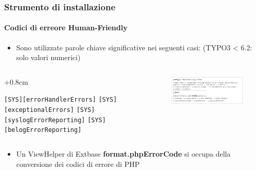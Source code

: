 
\begin{frame}[fragile]
	\frametitle{Strumento di installazione}
	\framesubtitle{Codici di erreore Human-Friendly}

	\begin{itemize}
		\item Sono utilizzate parole chiave significative nei seguenti casi:\newline
			(TYPO3 < 6.2: solo valori numerici)
	\end{itemize}

	\begin{columns}[T]
		\begin{column}{.5\textwidth}
			\advance\leftskip+0.8cm

			\smaller
				\texttt{[SYS][errorHandlerErrors]}\newline
				\texttt{[SYS][exceptionalErrors]}\newline
				\texttt{[SYS][syslogErrorReporting]}\newline
				\texttt{[SYS][belogErrorReporting]}\newline
			\normalsize

		\end{column}
		\begin{column}{.5\textwidth}

			\begin{figure}\vspace*{-0.4cm}
				\includegraphics[width=0.9\linewidth]{Images/InstallTool/HumanFriendlyErrorCodes.png}
			\end{figure}

		\end{column}
	\end{columns}

	\begin{itemize}
		\item Un ViewHelper di Extbase \textbf{format.phpErrorCode} si occupa della conversione dei codici di errore di PHP
	\end{itemize}

\end{frame}

